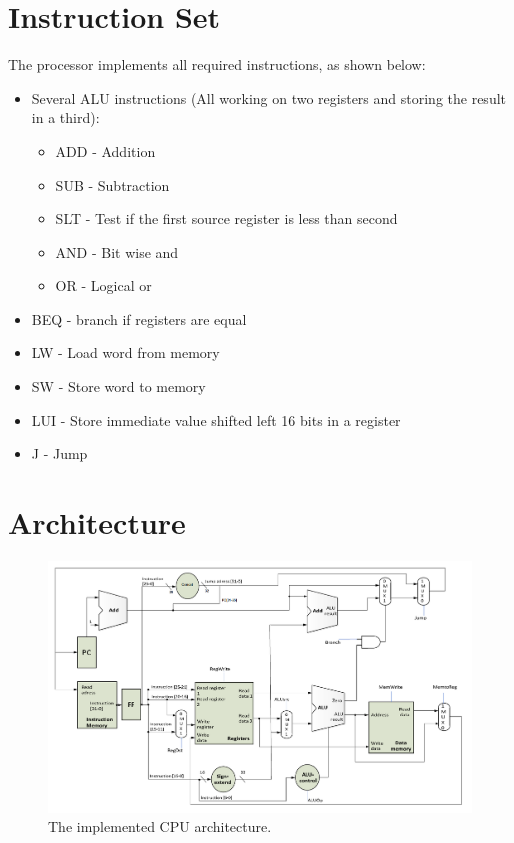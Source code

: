 \section{Instruction Set}

The processor implements all required instructions, as shown below:

\begin{itemize}
    \item Several ALU instructions (All working on two registers and storing the result in a third):
        \begin{itemize}
            \item ADD - Addition
            \item SUB - Subtraction
            \item SLT - Test if the first source register is less than second
            \item AND - Bit wise and
            \item OR  - Logical or
        \end{itemize}
    \item BEQ - branch if registers are equal
    \item LW - Load word from memory
    \item SW - Store word to memory
    \item LUI - Store immediate value shifted left 16 bits in a register
    \item J - Jump
\end{itemize}

\section{Architecture}

\begin{figure}[ht]
    \centering
    \includegraphics[scale=0.3]{figures/cpu2.png}
    \caption{\label{fig:cpuArchitecture}The implemented CPU architecture.} 
\end{figure}

